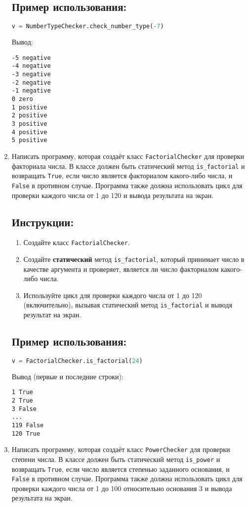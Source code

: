 \begin{enumerate}
\subsection*{Пример использования:}
\begin{lstlisting}[language=Python]
    v = NumberTypeChecker.check_number_type(-7)
\end{lstlisting}
Вывод:
\begin{verbatim}
-5 negative
-4 negative
-3 negative
-2 negative
-1 negative
0 zero
1 positive
2 positive
3 positive
4 positive
5 positive
\end{verbatim}

\item
Написать программу, которая создаёт класс \texttt{FactorialChecker} 
для проверки факториала числа. В классе должен быть статический метод
\texttt{is\_factorial} и возвращать \texttt{True}, если число является факториалом какого-либо числа, 
и \texttt{False} в противном случае. 
Программа также должна использовать цикл для проверки каждого числа от 
1 до 120 и вывода результата на экран.

\subsection*{Инструкции:}
\begin{enumerate}
    \item Создайте класс \texttt{FactorialChecker}.
    \item Создайте \textbf{статический} метод \texttt{is\_factorial}, который принимает число в качестве аргумента и проверяет, является ли число факториалом какого-либо числа.
    \item Используйте цикл для проверки каждого числа от 1 до 120 (включительно), вызывая статический метод \texttt{is\_factorial} и выводя результат на экран.
\end{enumerate}

\subsection*{Пример использования:}
\begin{lstlisting}[language=Python]
    v = FactorialChecker.is_factorial(24)
\end{lstlisting}
Вывод (первые и последние строки):
\begin{verbatim}
1 True
2 True
3 False
...
119 False
120 True
\end{verbatim}

\item
Написать программу, которая создаёт класс \texttt{PowerChecker} 
для проверки степени числа. В классе должен быть статический метод
\texttt{is\_power} и возвращать \texttt{True}, если число является степенью заданного основания, 
и \texttt{False} в противном случае. 
Программа также должна использовать цикл для проверки каждого числа от 
1 до 100 относительно основания 3 и вывода результата на экран.


\end{enumerate}
